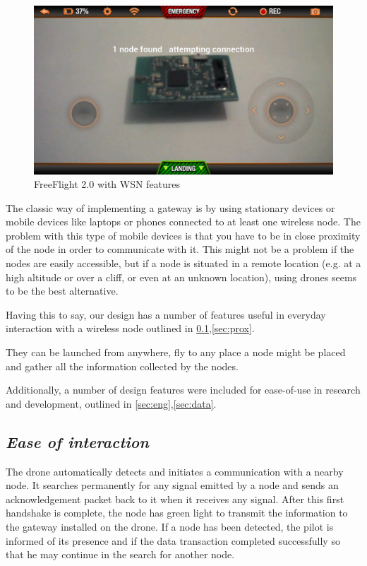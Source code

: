 \label{chap:arch}

\begin{figure}[ht] \centering
\includegraphics[width=1\textwidth]{img/app.png}
\caption{FreeFlight 2.0 with WSN features } \end{figure}

The classic way of implementing a gateway is by using stationary devices or mobile devices like laptops or phones connected to at least one wireless node. The problem with this type of mobile devices is that you have to be in close proximity of the node in order to communicate with it. This might not be a problem if the nodes are easily accessible, but if a node is situated in a remote location (e.g. at a high altitude or over a cliff, or even at an unknown location), using drones seems to be the best alternative.

Having this to say, our design has a number of features useful in everyday interaction with a wireless node outlined in \ref{sec:inter},\ref{sec:prox}. 

They can be launched from anywhere, fly to any place a node might be placed and gather all the information collected by the nodes.

Additionally, a number of design features were included for ease-of-use in
research and development, outlined in \ref{sec:eng},\ref{sec:data}.


\subsection{\textit{Ease of interaction}} 

\label{sec:inter}

The drone automatically detects and initiates a communication with a nearby node. It searches permanently for any signal emitted by a node and sends an acknowledgement packet back to it when it receives any signal. After this first handshake is complete, the node has green light to transmit the information to the gateway installed on the drone. If a node has been detected, the pilot is informed of its presence and if the data transaction completed successfully so that he may continue in the search for another node.

